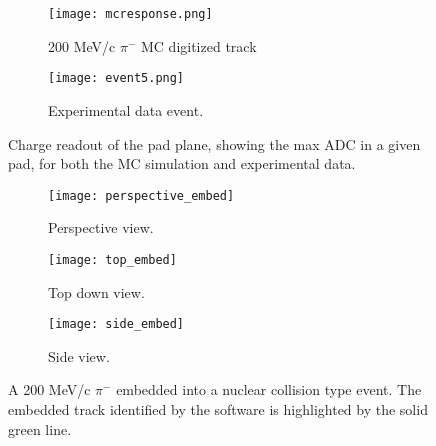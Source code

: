 
\begin{figure}[!htb]
    \centering
    \begin{subfigure}[t]{0.49\textwidth}
        \centering
        \texttt{[image: mcresponse.png]}
        \caption{200 MeV/c $\pi^-$ MC digitized track} \label{fig:mcevent}
    \end{subfigure}
    \hfill
    \begin{subfigure}[t]{.49\textwidth}
        \centering
        \texttt{[image: event5.png]} 
        \caption{Experimental data event.} \label{fig:dataevent}
    \end{subfigure}
    \caption{Charge readout of the pad plane, showing the max ADC in a given pad, for both the MC simulation and experimental data.}
\label{fig:mcDataEmbedtrack}
\end{figure}



\begin{figure}[!htb]
    \centering
    \begin{subfigure}[t]{0.49\textwidth}
        \centering
        \texttt{[image: perspective\_embed]}
        \caption{Perspective view.} \label{fig:persEmbed}
    \end{subfigure}
    \hfill
    \begin{subfigure}[t]{.3\textwidth}
        \centering
        \texttt{[image: top\_embed]} 
        \caption{Top down view.} \label{fig:topEmbed}
    \end{subfigure}
     \hfill
    \begin{subfigure}[t]{\textwidth}
        \centering
        \texttt{[image: side\_embed]} 
        \caption{Side view.} \label{fig:sideEmbed}
    \end{subfigure}
    \caption{A 200 MeV/c $\pi^-$ embedded into a nuclear collision type event. The embedded track identified by the software is highlighted by the solid green line. }

\label{fig:embedtrack}
\end{figure}



